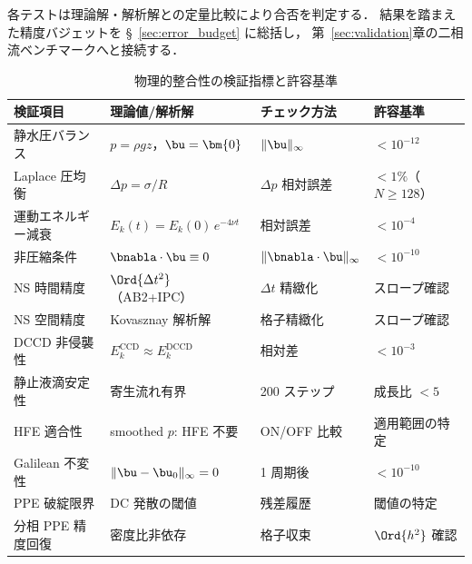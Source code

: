 \noindent
各テストは理論解・解析解との定量比較により合否を判定する．
結果を踏まえた精度バジェットを §~\ref{sec:error_budget} に総括し，
第~\ref{sec:validation}章の二相流ベンチマークへと接続する．

\begin{table}[htbp]
\centering
\caption{物理的整合性の検証指標と許容基準}
\label{tab:verification}
\renewcommand{\arraystretch}{1.3}
\begin{tabular}{p{38mm}p{38mm}p{30mm}p{22mm}}
\toprule
検証項目 & 理論値/解析解 & チェック方法 & 許容基準 \\
\midrule
静水圧バランス & $p = \rho g z$，$\bu = \bm{0}$ & $\|\bu\|_\infty$ & $< 10^{-12}$\\
Laplace 圧均衡 & $\Delta p = \sigma/R$ & $\Delta p$ 相対誤差 & $< 1\%$（$N \geq 128$）\\
運動エネルギー減衰 & $E_k(t) = E_k(0)\,e^{-4\nu t}$ & 相対誤差 & $< 10^{-4}$\\
非圧縮条件 & $\bnabla\cdot\bu \equiv 0$ & $\|\bnabla\cdot\bu\|_\infty$ & $< 10^{-10}$\\
NS 時間精度 & $\Ord{\Delta t^2}$（AB2+IPC） & $\Delta t$ 精緻化 & スロープ確認\\
NS 空間精度 & Kovasznay 解析解 & 格子精緻化 & スロープ確認\\
DCCD 非侵襲性 & $E_k^{\text{CCD}} \approx E_k^{\text{DCCD}}$ & 相対差 & $< 10^{-3}$\\
静止液滴安定性 & 寄生流れ有界 & 200 ステップ & 成長比 $< 5$\\
HFE 適合性 & smoothed $p$: HFE 不要 & ON/OFF 比較 & 適用範囲の特定\\
Galilean 不変性 & $\|\bu - \bu_0\|_\infty = 0$ & 1 周期後 & $< 10^{-10}$\\
PPE 破綻限界 & DC 発散の閾値 & 残差履歴 & 閾値の特定\\
分相 PPE 精度回復 & 密度比非依存 & 格子収束 & $\Ord{h^2}$ 確認\\
\bottomrule
\end{tabular}
\end{table}
